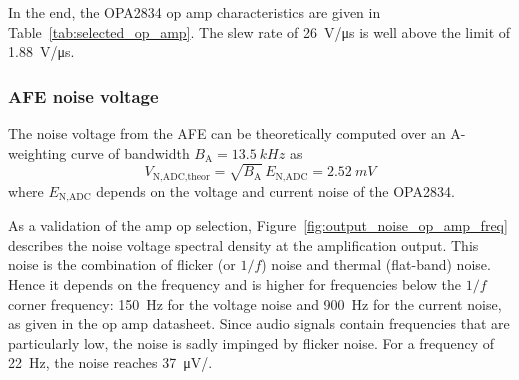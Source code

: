 \documentclass{EPL-master-thesis-covers-EN}
\newcommand{\te}[1]{\textrm{#1}}
\begin{document}

In the end, the OPA2834 op amp characteristics are given in Table~\ref{tab:selected_op_amp}. The slew rate of \SI{26}{V/\micro s} is well above the limit of \SI{1.88}{V/\micro s}.

\begin{table}[H]
\centering
{}
\caption{Characteristics of the selected operational amplifier: OPA2834}
\label{tab:selected_op_amp}
\end{table}


\subsubsection*{AFE noise voltage}

The noise voltage from the AFE can be theoretically computed over an A-weighting curve of bandwidth $B_\te{A} = \SI{13.5}{kHz}$ as
\[
 V_\te{N,ADC,theor} = \sqrt{B_\te{A}} \, E_\te{N,ADC} = \SI{2.52}{mV}
\]
where $E_\te{N,ADC}$ depends on the voltage and current noise of the OPA2834.

As a validation of the amp op selection, Figure~\ref{fig:output_noise_op_amp_freq} describes the noise voltage spectral density at the amplification output. 
This noise is the combination of flicker (or $1/f$) noise and thermal (flat-band) noise. Hence it depends on the frequency and is higher for frequencies below the $1/f$ corner frequency: \SI{150}{Hz} for the voltage noise and \SI{900}{Hz} for the current noise, as given in the op amp datasheet. Since audio signals contain frequencies that are particularly low, the noise is sadly impinged by flicker noise. For a frequency of \SI{22}{Hz}, the noise reaches \SI{37}{\micro V/}.
\end{document}
